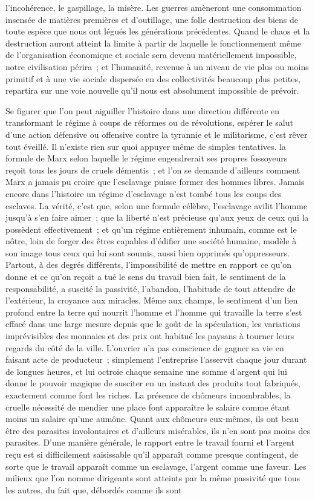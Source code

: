 \documentclass[french,twoside]{book} %
\begin{document}
l’incohérence, le gaspillage, la misère. Les guerres amèneront une consommation insensée de matières premières et d'outillage, une folle destruction des biens de toute espèce que nous ont légués les générations précédentes. Quand le chaos et la destruction auront atteint la limite à partir de laquelle le fonctionnement même de l'organisation économique et sociale sera devenu matériellement impossible, notre civilisation périra ; et l'humanité, revenue à un niveau de vie plus ou moins primitif et à une vie sociale dispersée en des collectivités beaucoup plus petites, repartira sur une voie nouvelle qu'il nous est absolument impossible de prévoir.\par
Se figurer que l'on peut aiguiller l'histoire dans une direction différente en transformant le régime à coups de réformes ou de révolutions, espérer le salut d'une action défensive ou offensive contre la tyrannie et le militarisme, c'est rêver tout éveillé. Il n'existe rien sur quoi appuyer même de simples tentatives. la formule de Marx selon laquelle le régime engendrerait ses propres fossoyeurs reçoit tous les jours de cruels démentis ; et l'on se demande d'ailleurs comment Marx a jamais pu croire que l'esclavage puisse former des hommes libres. Jamais encore dans l'histoire un régime d'esclavage n'est tombé tous les coups des esclaves. La vérité, c'est que, selon une formule célèbre, l'esclavage avilit l'homme jusqu'à s'en faire aimer ; que la liberté n'est précieuse qu'aux yeux de ceux qui la possèdent effectivement ; et qu'un régime entièrement inhumain, comme est le nôtre, loin de forger des êtres capables d'édifier une société humaine, modèle à son image tous ceux qui lui sont soumis, aussi bien opprimés qu'oppresseurs. Partout, à des degrés différents, l'impossibilité de mettre en rapport ce qu'on donne et ce qu'on reçoit a tué le sens du travail bien fait, le sentiment de la responsabilité, a suscité la passivité, l'abandon, l'habitude de tout attendre de l'extérieur, la croyance aux miracles. Même aux champs, le sentiment d'un lien profond entre la terre qui nourrit l'homme et l'homme qui travaille la terre s'est effacé dans une large mesure depuis que le goût de la spéculation, les variations imprévisibles des monnaies et des prix ont habitué les paysans à tourner leurs regards du côté de la ville. L'ouvrier n'a pas conscience de gagner sa vie en faisant acte de producteur ; simplement l'entreprise l'asservit chaque jour durant de longues heures, et lui octroie chaque semaine une somme d'argent qui lui donne le pouvoir magique de susciter en un instant des produits tout fabriqués, exactement comme font les riches. La présence de chômeurs innombrables, la cruelle nécessité de mendier une place font apparaître le salaire comme étant moins un salaire qu'une aumône. Quant aux chômeurs eux-mêmes, ils ont beau être des parasites involontaires et d'ailleurs misérables, ils n'en sont pas moins des parasites. D'une manière générale, le rapport entre le travail fourni et l'argent reçu est si difficilement saisissable qu'il apparaît comme presque contingent, de sorte que le travail apparaît comme un esclavage, l'argent comme une faveur. Les milieux que l'on nomme dirigeants sont atteints par la même passivité que tous les autres, du fait que, débordés comme ils sont 
\end{document}
